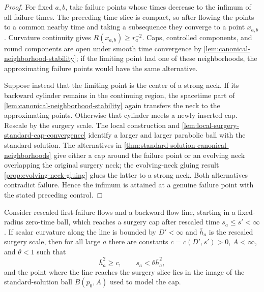 \begin{proof}
For fixed $a,b$, take failure points whose times decrease to the infimum of
all failure times.  The preceding time slice is compact, so after flowing
the points to a common nearby time and taking a subsequence they converge to
a point $x_{a,b}$.  Curvature continuity gives
$R(x_{a,b})\ge r_a^{-2}$.  Caps, controlled components, and round components
are open under smooth time convergence by
\ref{lem:canonical-neighborhood-stability}; if the limiting point had one of
these neighborhoods, the approximating failure points would have the same
alternative.

Suppose instead that the limiting point is the center of a strong neck.
If its backward cylinder remains in the continuing region, the spacetime
part of \ref{lem:canonical-neighborhood-stability} again transfers the neck
to the approximating points.  Otherwise that cylinder meets a newly inserted
cap.  Rescale by the surgery scale.  The local construction and
\ref{lem:local-surgery-standard-cap-convergence} identify a larger and
larger parabolic ball with the standard solution.  The alternatives in
\ref{thm:standard-solution-canonical-neighborhoods} give either a cap around
the failure point or an evolving neck overlapping the original surgery
neck; the evolving-neck gluing result \ref{prop:evolving-neck-gluing} glues the latter to
a strong neck.  Both alternatives contradict failure.  Hence the infimum is
attained at a genuine failure point with the stated preceding control.
\end{proof}

\begin{lemma}
\label{lem:standard-cap-encounter-control}
\notready
Consider rescaled first-failure flows and a backward flow line, starting in
a fixed-radius zero-time ball, which reaches a surgery cap after rescaled
time $s_a\le s'<\infty$.  If scalar curvature along the line is bounded by
$D'<\infty$ and $\bar h_a$ is the rescaled surgery scale, then for all large
$a$ there are constants $c=c(D',s')>0$, $A<\infty$, and $\theta<1$ such that
\[
 \bar h_a^2\ge c,
 \qquad s_a<\theta\bar h_a^2,
\]
and the point where the line reaches the surgery slice lies in the image of
the standard-solution ball $B(p_0,A)$ used to model the cap.
\end{lemma}

